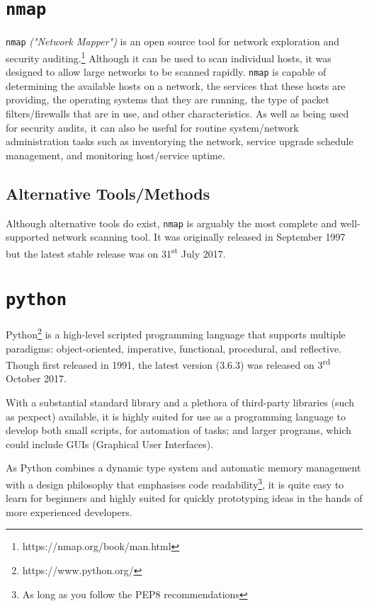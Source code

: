 \documentclass[12pt]{report}
\begin{document}
\section{\texttt{nmap}}
\texttt{nmap} \textit{("Network Mapper")} is an open source tool for network exploration and security auditing.\footnote{https://nmap.org/book/man.html} Although it can be used to scan individual hosts, it was designed to allow large networks to be scanned rapidly. \texttt{nmap} is capable of determining the available hosts on a network, the services that these hosts are providing, the operating systems that they are running, the type of packet filters/firewalls that are in use, and other characteristics. As well as being used for security audits, it can also be useful for routine system/network administration tasks such as inventorying the network, service upgrade schedule management, and monitoring host/service uptime.
\subsection*{Alternative Tools/Methods}
Although alternative tools do exist, \texttt{nmap} is arguably the most complete and well-supported network scanning tool. It was originally released in September 1997 but the latest stable release was on 31\textsuperscript{st} July 2017.

\section{\texttt{python}}
Python\footnote{https://www.python.org/} is a high-level scripted programming language that supports multiple paradigms: object-oriented, imperative, functional, procedural, and reflective. Though first released in 1991, the latest version (3.6.3) was released on 3\textsuperscript{rd} October 2017.

With a substantial standard library and a plethora of third-party libraries (such as pexpect) available, it is highly suited for use as a programming language to develop both small scripts, for automation of tasks; and larger programs, which could include GUIs (Graphical User Interfaces).

As Python combines a dynamic type system and automatic memory management with a design philosophy that emphasises code readability\footnote{As long as you follow the PEP8 recommendations}, it is quite easy to learn for beginners and highly suited for quickly prototyping ideas in the hands of more experienced developers.
\end{document}
